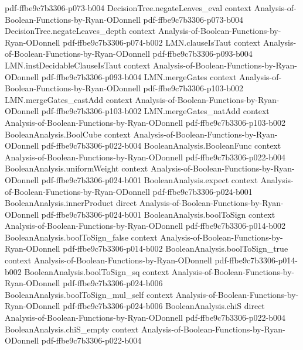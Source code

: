 \begin{theorem}
  {pdf-ffbe9c7b3306-p073-b004}
\proofstep
  {DecisionTree.negateLeaves_eval}
  {context}
  {Analysis-of-Boolean-Functions-by-Ryan-ODonnell}
  {pdf-ffbe9c7b3306-p073-b004}
\proofstep
  {DecisionTree.negateLeaves_depth}
  {context}
  {Analysis-of-Boolean-Functions-by-Ryan-ODonnell}
  {pdf-ffbe9c7b3306-p074-b002}
\proofstep
  {LMN.clauseIsTaut}
  {context}
  {Analysis-of-Boolean-Functions-by-Ryan-ODonnell}
  {pdf-ffbe9c7b3306-p093-b004}
\proofstep
  {LMN.instDecidableClauseIsTaut}
  {context}
  {Analysis-of-Boolean-Functions-by-Ryan-ODonnell}
  {pdf-ffbe9c7b3306-p093-b004}
\proofstep
  {LMN.mergeGates}
  {context}
  {Analysis-of-Boolean-Functions-by-Ryan-ODonnell}
  {pdf-ffbe9c7b3306-p103-b002}
\proofstep
  {LMN.mergeGates_castAdd}
  {context}
  {Analysis-of-Boolean-Functions-by-Ryan-ODonnell}
  {pdf-ffbe9c7b3306-p103-b002}
\proofstep
  {LMN.mergeGates_natAdd}
  {context}
  {Analysis-of-Boolean-Functions-by-Ryan-ODonnell}
  {pdf-ffbe9c7b3306-p103-b002}
\proofstep
  {BooleanAnalysis.BoolCube}
  {context}
  {Analysis-of-Boolean-Functions-by-Ryan-ODonnell}
  {pdf-ffbe9c7b3306-p022-b004}
\proofstep
  {BooleanAnalysis.BooleanFunc}
  {context}
  {Analysis-of-Boolean-Functions-by-Ryan-ODonnell}
  {pdf-ffbe9c7b3306-p022-b004}
\proofstep
  {BooleanAnalysis.uniformWeight}
  {context}
  {Analysis-of-Boolean-Functions-by-Ryan-ODonnell}
  {pdf-ffbe9c7b3306-p024-b001}
\proofstep
  {BooleanAnalysis.expect}
  {context}
  {Analysis-of-Boolean-Functions-by-Ryan-ODonnell}
  {pdf-ffbe9c7b3306-p024-b001}
\proofstep
  {BooleanAnalysis.innerProduct}
  {direct}
  {Analysis-of-Boolean-Functions-by-Ryan-ODonnell}
  {pdf-ffbe9c7b3306-p024-b001}
\proofstep
  {BooleanAnalysis.boolToSign}
  {context}
  {Analysis-of-Boolean-Functions-by-Ryan-ODonnell}
  {pdf-ffbe9c7b3306-p014-b002}
\proofstep
  {BooleanAnalysis.boolToSign_false}
  {context}
  {Analysis-of-Boolean-Functions-by-Ryan-ODonnell}
  {pdf-ffbe9c7b3306-p014-b002}
\proofstep
  {BooleanAnalysis.boolToSign_true}
  {context}
  {Analysis-of-Boolean-Functions-by-Ryan-ODonnell}
  {pdf-ffbe9c7b3306-p014-b002}
\proofstep
  {BooleanAnalysis.boolToSign_sq}
  {context}
  {Analysis-of-Boolean-Functions-by-Ryan-ODonnell}
  {pdf-ffbe9c7b3306-p024-b006}
\proofstep
  {BooleanAnalysis.boolToSign_mul_self}
  {context}
  {Analysis-of-Boolean-Functions-by-Ryan-ODonnell}
  {pdf-ffbe9c7b3306-p024-b006}
\proofstep
  {BooleanAnalysis.chiS}
  {direct}
  {Analysis-of-Boolean-Functions-by-Ryan-ODonnell}
  {pdf-ffbe9c7b3306-p022-b004}
\proofstep
  {BooleanAnalysis.chiS_empty}
  {context}
  {Analysis-of-Boolean-Functions-by-Ryan-ODonnell}
  {pdf-ffbe9c7b3306-p022-b004}

\end{theorem}
